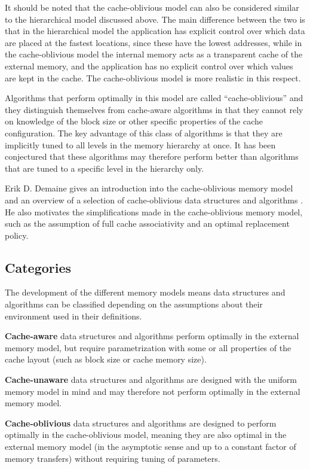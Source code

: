 \documentclass{acm_proc_article-sp}
\begin{document}
It should be noted that the cache-oblivious model can also be considered similar to the hierarchical model discussed above. The main difference between the two is that in the hierarchical model the application has explicit control over which data are placed at the fastest locations, since these have the lowest addresses, while in the cache-oblivious model the internal memory acts as a transparent cache of the external memory, and the application has no explicit control over which values are kept in the cache. The cache-oblivious model is more realistic in this respect.

Algorithms that perform optimally in this model are called ``cache-oblivious'' and they distinguish themselves from cache-aware algorithms in that they cannot rely on knowledge of the block size or other specific properties of the cache configuration. The key advantage of this class of algorithms is that they are implicitly tuned to all levels in the memory hierarchy at once. It has been conjectured that these algorithms may therefore perform better than algorithms that are tuned to a specific level in the hierarchy only.

Erik D. Demaine gives an introduction into the cache-oblivious memory model and an overview of a selection of cache-oblivious data structures and algorithms \cite{demaine2002coa}. He also motivates the simplifications made in the cache-oblivious memory model, such as the assumption of full cache associativity and an optimal replacement policy.

\subsection{Categories}
The development of the different memory models means data structures and algorithms can be classified depending on the assumptions about their environment used in their definitions.
\begin{list}{}{}
\item \textbf{Cache-aware} data structures and algorithms perform optimally in the external memory model, but require parametrization with some or all properties of the cache layout (such as block size or cache memory size).
\item \textbf{Cache-unaware} data structures and algorithms are designed with the uniform memory model in mind and may therefore not perform optimally in the external memory model.
\item \textbf{Cache-oblivious} data structures and algorithms are designed to perform optimally in the cache-oblivious model, meaning they are also optimal in the external memory model (in the asymptotic sense and up to a constant factor of memory transfers) without requiring tuning of parameters.
\end{list}
\end{document}
